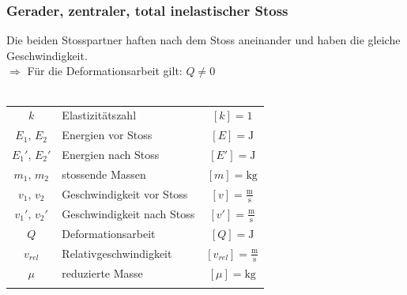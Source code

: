 	
	
	
	
	
	\subsubsection{Gerader, zentraler, total inelastischer Stoss}
	Die beiden Stosspartner haften nach dem Stoss aneinander und haben die gleiche Geschwindigkeit. \\
	$\Rightarrow$ Für die Deformationsarbeit gilt: $Q \neq 0$ \\
	\\
	
	
	
	\vfill\null
	\columnbreak

	
	
	\begin{tabular}{c l c}
	$k$ & Elastizitätszahl & $[k] = 1$ \\
	$E_1, \,E_2$ & Energien vor Stoss & $[E] = \mathrm{J}$ \\	
	$E_1 ', \, E_2 '$ & Energien nach Stoss & $[E'] = \mathrm{J}$ \\	
	$m_1, \, m_2$ & stossende Massen & $[m] = \mathrm{kg}$ \\
	$v_1, \, v_2$ & Geschwindigkeit vor Stoss & $[v] = \mathrm{\frac{m}{s}}$ \\
	$v_1', \, v_2'$ & Geschwindigkeit nach Stoss & $[v'] = \mathrm{\frac{m}{s}}$ \\
	$Q$ & Deformationsarbeit & $[Q] = \mathrm{J}$ \\
	$v_{rel}$ & Relativgeschwindigkeit &  $[v_{rel}] = \mathrm{\frac{m}{s}}$ \\
	$\mu$ & reduzierte Masse & $[\mu] = \mathrm{kg}$ \\
	\\
	\end{tabular}
	
